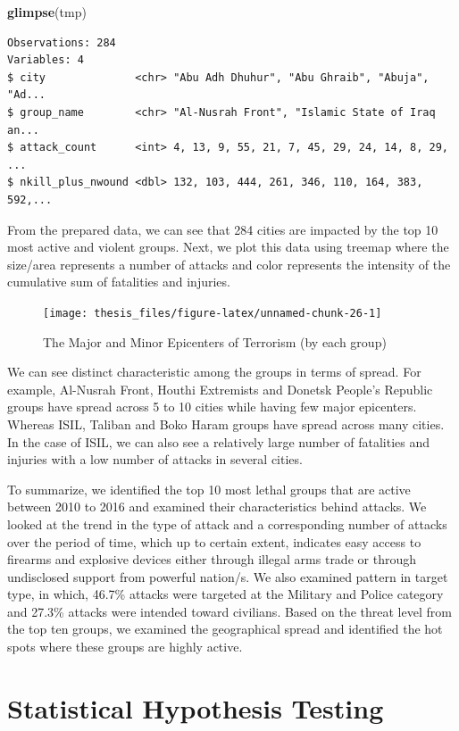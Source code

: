 \documentclass[11pt,oneside,a4paper]{reedthesis}
\newenvironment{Shaded}{\begin{snugshade}}{\end{snugshade}}
\newcommand{\KeywordTok}[1]{\textcolor[rgb]{0.13,0.29,0.53}{\textbf{#1}}}
\newcommand{\NormalTok}[1]{#1}
\begin{document}
\begin{Shaded}
\begin{Highlighting}[]
\KeywordTok{glimpse}\NormalTok{(tmp)}
\end{Highlighting}
\end{Shaded}
\begin{verbatim}
Observations: 284
Variables: 4
$ city              <chr> "Abu Adh Dhuhur", "Abu Ghraib", "Abuja", "Ad...
$ group_name        <chr> "Al-Nusrah Front", "Islamic State of Iraq an...
$ attack_count      <int> 4, 13, 9, 55, 21, 7, 45, 29, 24, 14, 8, 29, ...
$ nkill_plus_nwound <dbl> 132, 103, 444, 261, 346, 110, 164, 383, 592,...
\end{verbatim}
From the prepared data, we can see that 284 cities are impacted by the
top 10 most active and violent groups. Next, we plot this data using
treemap where the size/area represents a number of attacks and color
represents the intensity of the cumulative sum of fatalities and
injuries.
\begin{figure}
\texttt{[image: thesis\_files/figure-latex/unnamed-chunk-26-1]} \caption{The Major and Minor Epicenters of Terrorism (by each group)}\label{fig:unnamed-chunk-26}
\end{figure}
We can see distinct characteristic among the groups in terms of spread.
For example, Al-Nusrah Front, Houthi Extremists and Donetsk People's
Republic groups have spread across 5 to 10 cities while having few major
epicenters. Whereas ISIL, Taliban and Boko Haram groups have spread
across many cities. In the case of ISIL, we can also see a relatively
large number of fatalities and injuries with a low number of attacks in
several cities.

To summarize, we identified the top 10 most lethal groups that are
active between 2010 to 2016 and examined their characteristics behind
attacks. We looked at the trend in the type of attack and a
corresponding number of attacks over the period of time, which up to
certain extent, indicates easy access to firearms and explosive devices
either through illegal arms trade or through undisclosed support from
powerful nation/s. We also examined pattern in target type, in which,
46.7\% attacks were targeted at the Military and Police category and
27.3\% attacks were intended toward civilians. Based on the threat level
from the top ten groups, we examined the geographical spread and
identified the hot spots where these groups are highly active.

\chapter{Statistical Hypothesis Testing}\label{hypothesis-testing}
\end{document}
